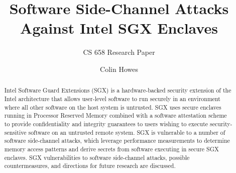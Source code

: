 \documentclass[sigconf]{acmart}
\begin{document}
\title{Software Side-Channel Attacks Against Intel SGX Enclaves}
\subtitle{CS 658 Research Paper}


\author{Colin Howes}

\begin{abstract}

Intel Software Guard Extensions (SGX) is a hardware-backed security extension of the Intel architecture that allows user-level software to run securely in an environment where all other software on the host system is untrusted. SGX uses secure enclaves running in Processor Reserved Memory combined with a software attestation scheme to provide confidentiality and integrity guarantees to users wishing to execute security-sensitive software on an untrusted remote system. SGX is vulnerable to a number of software side-channel attacks, which leverage performance measurements to determine memory access patterns and derive secrets from software executing in secure SGX enclaves. SGX vulnerabilities to software side-channel attacks, possible countermeasures, and directions for future research are discussed.

\end{abstract}

\maketitle




 
\end{document}
